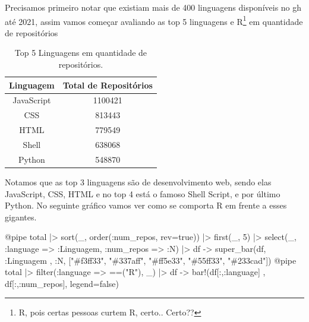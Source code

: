 \documentclass[
  letterpaper,
  DIV=11,
  numbers=noendperiod]{scrartcl}
\newenvironment{Shaded}{\begin{snugshade}}{\end{snugshade}}
\newcommand{\ConstantTok}[1]{\textcolor[rgb]{0.56,0.35,0.01}{#1}}
\newcommand{\FloatTok}[1]{\textcolor[rgb]{0.68,0.00,0.00}{#1}}
\newcommand{\FunctionTok}[1]{\textcolor[rgb]{0.28,0.35,0.67}{#1}}
\newcommand{\NormalTok}[1]{\textcolor[rgb]{0.00,0.23,0.31}{#1}}
\newcommand{\OperatorTok}[1]{\textcolor[rgb]{0.37,0.37,0.37}{#1}}
\newcommand{\PreprocessorTok}[1]{\textcolor[rgb]{0.68,0.00,0.00}{#1}}
\newcommand{\StringTok}[1]{\textcolor[rgb]{0.13,0.47,0.30}{#1}}
\begin{document}
Precisamos primeiro notar que existiam mais de 400 linguagens
disponíveis no gh até 2021, assim vamos começar avaliando as top 5
linguagens e R\footnote{R, pois certas pessoas curtem R, certo.. Certo??}
em quantidade de repositórios

\begin{table}[H]


\centering
\begin{tabular}[t]{c|c}
\hline
Linguagem & Total de Repositórios\\
\hline
JavaScript & 1100421\\
\hline
CSS & 813443\\
\hline
HTML & 779549\\
\hline
Shell & 638068\\
\hline
Python & 548870\\
\hline
\end{tabular}
\caption{Top 5 Linguagens em quantidade de repositórios.}
\end{table}

Notamos que as top 3 linguagens são de desenvolvimento web, sendo elas
JavaScript, CSS, HTML e no top 4 está o famoso Shell Script, e por
último Python. No seguinte gráfico vamos ver como se comporta R em
frente a esses gigantes.

\begin{Shaded}
\begin{Highlighting}[]
\PreprocessorTok{@pipe}\NormalTok{ total }\OperatorTok{|\textgreater{}}
      \FunctionTok{sort}\NormalTok{(\_, }\FunctionTok{order}\NormalTok{(}\OperatorTok{:}\NormalTok{num\_repos, rev}\OperatorTok{=}\ConstantTok{true}\NormalTok{)) }\OperatorTok{|\textgreater{}}
      \FunctionTok{first}\NormalTok{(\_, }\FloatTok{5}\NormalTok{) }\OperatorTok{|\textgreater{}}
      \FunctionTok{select}\NormalTok{(\_, }\OperatorTok{:}\NormalTok{language }\OperatorTok{=\textgreater{}} \OperatorTok{:}\NormalTok{Linguagem, }\OperatorTok{:}\NormalTok{num\_repos }\OperatorTok{=\textgreater{}} \OperatorTok{:}\NormalTok{N) }\OperatorTok{|\textgreater{}}
\NormalTok{      df }\OperatorTok{{-}\textgreater{}} \FunctionTok{super\_bar}\NormalTok{(df, }\OperatorTok{:}\NormalTok{Linguagem , }\OperatorTok{:}\NormalTok{N, [}\StringTok{"\#f3ff33"}\NormalTok{, }\StringTok{"\#337aff"}\NormalTok{,}
      \StringTok{"\#ff5e33"}\NormalTok{, }\StringTok{"\#55ff33"}\NormalTok{, }\StringTok{"\#233cad"}\NormalTok{])}
\PreprocessorTok{@pipe}\NormalTok{  total }\OperatorTok{|\textgreater{}} 
      \FunctionTok{filter}\NormalTok{(}\OperatorTok{:}\NormalTok{language }\OperatorTok{=\textgreater{}}  \OperatorTok{==}\NormalTok{(}\StringTok{"R"}\NormalTok{), \_) }\OperatorTok{|\textgreater{}} 
\NormalTok{       df }\OperatorTok{{-}\textgreater{}} \FunctionTok{bar!}\NormalTok{(df[}\OperatorTok{:}\NormalTok{,}\OperatorTok{:}\NormalTok{language] , df[}\OperatorTok{:}\NormalTok{,}\OperatorTok{:}\NormalTok{num\_repos], legend}\OperatorTok{=}\ConstantTok{false}\NormalTok{)}
\end{Highlighting}
\end{Shaded}
\end{document}
